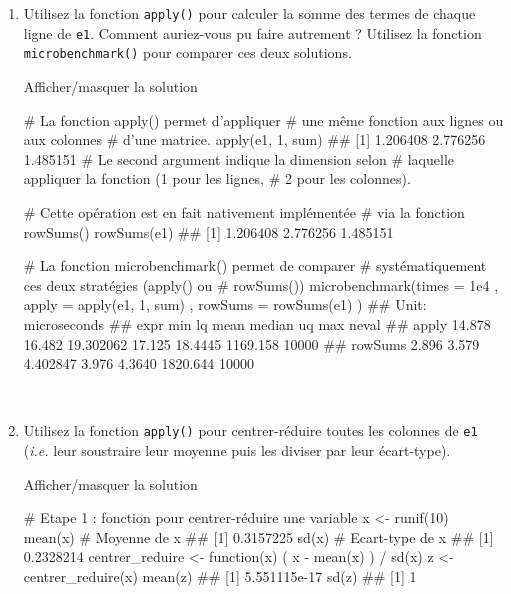 \documentclass[12pt,]{article}
\newenvironment{Shaded}{}{}
\newcommand{\KeywordTok}[1]{\textcolor[rgb]{0.00,0.00,1.00}{{#1}}}
\newcommand{\DataTypeTok}[1]{{#1}}
\newcommand{\DecValTok}[1]{{#1}}
\newcommand{\FloatTok}[1]{{#1}}
\newcommand{\StringTok}[1]{\textcolor[rgb]{0.00,0.50,0.50}{{#1}}}
\newcommand{\CommentTok}[1]{\textcolor[rgb]{0.00,0.50,0.00}{{#1}}}
\newcommand{\NormalTok}[1]{{#1}}
\begin{document}
\begin{enumerate}
  ~
\item
  Utilisez la fonction \texttt{apply()} pour calculer la somme des
  termes de chaque ligne de \texttt{e1}. Comment auriez-vous pu faire
  autrement ? Utilisez la fonction \texttt{microbenchmark()} pour
  comparer ces deux solutions.

  Afficher/masquer la solution

  \hypertarget{sol21}{}
\begin{Shaded}
\begin{Highlighting}[]
\CommentTok{# La fonction apply() permet d'appliquer}
\CommentTok{# une même fonction aux lignes ou aux colonnes}
\CommentTok{# d'une matrice. }
\KeywordTok{apply}\NormalTok{(e1, }\DecValTok{1}\NormalTok{, sum)}
\NormalTok{## [1] 1.206408 2.776256 1.485151}
\CommentTok{# Le second argument indique la dimension selon}
\CommentTok{# laquelle appliquer la fonction (1 pour les lignes, }
\CommentTok{# 2 pour les colonnes). }

\CommentTok{# Cette opération est en fait nativement implémentée}
\CommentTok{# via la fonction rowSums()}
\KeywordTok{rowSums}\NormalTok{(e1)}
\NormalTok{## [1] 1.206408 2.776256 1.485151}

\CommentTok{# La fonction microbenchmark() permet de comparer}
\CommentTok{# systématiquement ces deux stratégies (apply() ou}
\CommentTok{# rowSums())}
\KeywordTok{microbenchmark}\NormalTok{(}\DataTypeTok{times =} \FloatTok{1e4}
  \NormalTok{, }\DataTypeTok{apply =} \KeywordTok{apply}\NormalTok{(e1, }\DecValTok{1}\NormalTok{, sum)}
  \NormalTok{, }\DataTypeTok{rowSums =} \KeywordTok{rowSums}\NormalTok{(e1)}
\NormalTok{)}
\NormalTok{## Unit: microseconds}
\NormalTok{##     expr    min     lq      mean median      uq      max neval}
\NormalTok{##    apply 14.878 16.482 19.302062 17.125 18.4445 1169.158 10000}
\NormalTok{##  rowSums  2.896  3.579  4.402847  3.976  4.3640 1820.644 10000}
\end{Highlighting}
\end{Shaded}

  ~
\item
  Utilisez la fonction \texttt{apply()} pour centrer-réduire toutes les
  colonnes de \texttt{e1} (\emph{i.e.} leur soustraire leur moyenne puis
  les diviser par leur écart-type).

  Afficher/masquer la solution

  \hypertarget{sol22}{}
\begin{Shaded}
\begin{Highlighting}[]
\CommentTok{# Etape 1 : fonction pour centrer-réduire une variable}
\NormalTok{x <-}\StringTok{ }\KeywordTok{runif}\NormalTok{(}\DecValTok{10}\NormalTok{)}
\KeywordTok{mean}\NormalTok{(x) }\CommentTok{# Moyenne de x}
\NormalTok{## [1] 0.3157225}
\KeywordTok{sd}\NormalTok{(x) }\CommentTok{# Ecart-type de x}
\NormalTok{## [1] 0.2328214}
\NormalTok{centrer_reduire <-}\StringTok{ }\NormalTok{function(x) ( x -}\StringTok{ }\KeywordTok{mean}\NormalTok{(x) ) /}\StringTok{ }\KeywordTok{sd}\NormalTok{(x)}
\NormalTok{z <-}\StringTok{ }\KeywordTok{centrer_reduire}\NormalTok{(x)}
\KeywordTok{mean}\NormalTok{(z)}
\NormalTok{## [1] 5.551115e-17}
\KeywordTok{sd}\NormalTok{(z)}
\NormalTok{## [1] 1}


\end{Highlighting}
\end{Shaded}
\end{enumerate}
\end{document}
